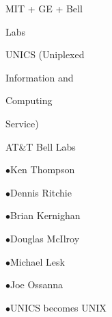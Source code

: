 \documentclass[a4paper,portrait,12pt]{article}
\begin{document}
\begin{flushleft}
MIT + GE + Bell
\end{flushleft}


\begin{flushleft}
Labs
\end{flushleft}







\begin{flushleft}
UNICS (Uniplexed
\end{flushleft}


\begin{flushleft}
Information and
\end{flushleft}


\begin{flushleft}
Computing
\end{flushleft}


\begin{flushleft}
Service)
\end{flushleft}


\begin{flushleft}
AT\&T Bell Labs
\end{flushleft}


\begin{flushleft}
$\bullet$Ken Thompson
\end{flushleft}


\begin{flushleft}
$\bullet$Dennis Ritchie
\end{flushleft}


\begin{flushleft}
$\bullet$Brian Kernighan
\end{flushleft}


\begin{flushleft}
$\bullet$Douglas McIlroy
\end{flushleft}


\begin{flushleft}
$\bullet$Michael Lesk
\end{flushleft}


\begin{flushleft}
$\bullet$Joe Ossanna
\end{flushleft}







\begin{flushleft}
$\bullet$UNICS becomes UNIX
\end{flushleft}
\end{document}

